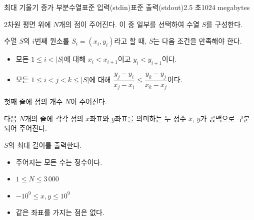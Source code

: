 \def\probtitle{최대 기울기 증가 부분수열}
\def\probno{L} %

\begin{problem}{\probtitle}{표준 입력(stdin)}{표준 출력(stdout)}{2.5 초}{1024 megabytes}

2차원 평면 위에 $N$개의 점이 주어진다. 이 중 일부를 선택하여 수열 $S$를 구성한다.

수열 $S$의 $i$번째 원소를 $S_i = (x_i, y_i)$라고 할 때, $S$는 다음 조건을 만족해야 한다.
\begin{itemize}[topsep=0pt,noitemsep]
\item 모든 $1\leq i < |S|$에 대해 $x_i < x_{i+1}$이고 $y_i < y_{i+1}$이다.
\item 모든 $1\leq i < j < k \leq \lvert S\rvert$에 대해 $\dfrac{y_j - y_i}{x_j - x_i} \leq \dfrac{y_k - y_j}{x_k - x_j}$이다.
\end{itemize}

\InputFile

첫째 줄에 점의 개수 $N$이 주어진다.

다음 $N$개의 줄에 각각 점의 $x$좌표와 $y$좌표를 의미하는 두 정수 $x$, $y$가 공백으로 구분되어 주어진다.

\OutputFile

$S$의 최대 길이를 출력한다.

\Constraints

\begin{itemize}[topsep=0pt,noitemsep]
    \item 주어지는 모든 수는 정수이다.
    \item $1 \le N \le 3\,000$
    \item $-10^9 \le x,y \le 10^9$
    \item 같은 좌표를 가지는 점은 없다.
\end{itemize}

\Example

\begin{example}
\end{example}

\end{problem}